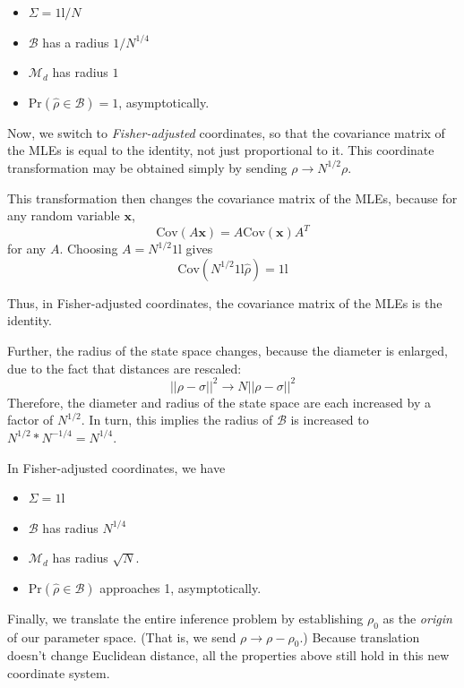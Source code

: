 \documentclass[aps,pra, twocolumn]{revtex4-1}
\newcommand{\bs}[1]{\boldsymbol{#1}}
\newcommand{\M}{\mathcal{M}}
\newcommand{\Id}{\mathbb{I}}
\def\Id{1\!\mathrm{l}}
\begin{document}
 \begin{itemize}
 \item $\Sigma = \Id/N$
 \item $\mathcal{B}$ has a radius $1/N^{1/4}$
 \item $\M_{d}$ has radius $1$
 \item $\mathrm{Pr}\left(\hat{\rho} \in \mathcal{B}\right) = 1$, asymptotically.
 \end{itemize}
 
Now, we switch to \emph{Fisher-adjusted} coordinates, so that the covariance matrix of the MLEs is equal to the identity, not just proportional to it. This coordinate transformation may be obtained simply by sending $\rho \rightarrow N^{1/2}\rho$.

This transformation then changes the covariance matrix of the MLEs, because for any random variable $\bs{x}$,
\[\mathrm{Cov}(A\bs{x}) = A\mathrm{Cov}(\bs{x})A^{T} \]
for any $A$. Choosing $A = N^{1/2}\Id$ gives
\[\mathrm{Cov}(N^{1/2}\Id\hat{\rho}) = \Id\]

 Thus, in Fisher-adjusted coordinates, the covariance matrix of the MLEs is the identity.

Further, the radius of the state space changes, because the diameter is enlarged, due to the fact that distances are rescaled:
\[||\rho - \sigma||^{2} \rightarrow N||\rho - \sigma||^{2}\]
Therefore, the diameter and radius of the state space are each increased by a factor of $N^{1/2}$. In turn, this implies the radius of $\mathcal{B}$ is increased to $N^{1/2}*N^{-1/4} = N^{1/4}$.

In Fisher-adjusted coordinates, we have

 \begin{itemize}
 \item $\Sigma = \Id$
 \item $\mathcal{B}$ has radius $N^{1/4}$
 \item $\M_{d}$ has radius $\sqrt{N}$.
 \item $\mathrm{Pr}\left(\hat{\rho} \in \mathcal{B}\right)$ approaches 1, asymptotically.
 \end{itemize}

Finally, we translate the entire inference problem by establishing $\rho_{0}$ as the \emph{origin} of our parameter space. (That is, we send $\rho \rightarrow \rho - \rho_{0}$.) Because translation doesn't change Euclidean distance, all the properties above still hold in this new coordinate system.
\end{document}
